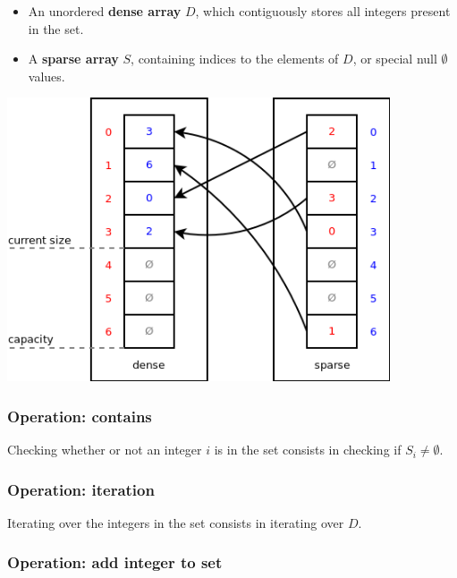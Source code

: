 \documentclass[twoside, 12pt, a4paper, openany]{book}
\let\origfigure=\figure
\let\endorigfigure=\endfigure
\renewenvironment{figure}[1][]{%
\origfigure[H]
}{%
\endorigfigure
}
\begin{document}
\begin{itemize}
\item
  An unordered \textbf{dense array} \(D\), which contiguously stores all
  integers present in the set.
\item
  A \textbf{sparse array} \(S\), containing indices to the elements of
  \(D\), or special null \(\emptyset\) values.
\end{itemize}

\begin{figure}[htbp]
\centering
\includegraphics[width=0.85000\textwidth]{source/figures/sparseset.png}
\caption{ECST miscellaneous: fixed sparse integer set
example}\label{sparsesetexample}
\end{figure}

\subsubsection{Operation: contains}\label{operation-contains}

Checking whether or not an integer \(i\) is in the set consists in
checking if \(S_i \neq \emptyset\).

\subsubsection{Operation: iteration}\label{operation-iteration}

Iterating over the integers in the set consists in iterating over \(D\).

\subsubsection{Operation: add integer to
set}\label{operation-add-integer-to-set}
\end{document}
